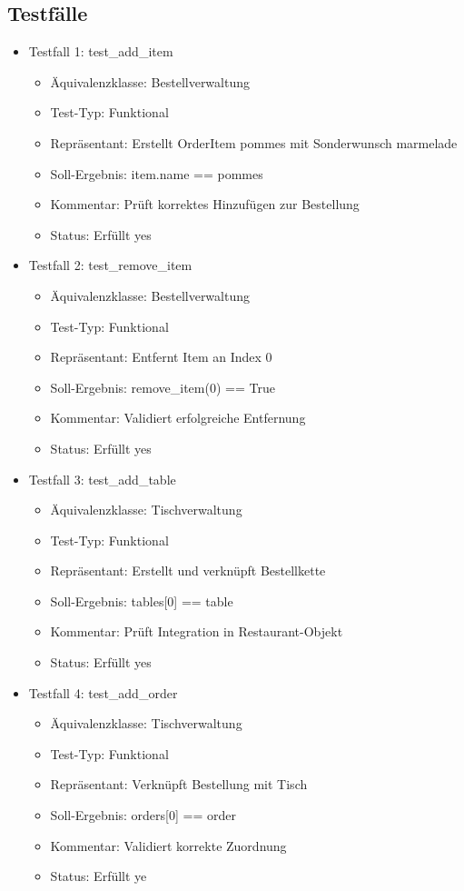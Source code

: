 \documentclass[a4paper,11pt]{article}
\begin{document}
\subsection{Testfälle}
\begin{itemize}
    \item Testfall 1: test\_add\_item
    \begin{itemize}
        \item Äquivalenzklasse: Bestellverwaltung
        \item Test-Typ: Funktional
        \item Repräsentant: Erstellt OrderItem pommes mit Sonderwunsch marmelade
        \item Soll-Ergebnis: item.name == pommes
        \item Kommentar: Prüft korrektes Hinzufügen zur Bestellung
        \item Status: Erfüllt yes
    \end{itemize}
    \item Testfall 2: test\_remove\_item
    \begin{itemize}
        \item Äquivalenzklasse: Bestellverwaltung
        \item Test-Typ: Funktional
        \item Repräsentant: Entfernt Item an Index 0
        \item Soll-Ergebnis: remove\_item(0) == True
        \item Kommentar: Validiert erfolgreiche Entfernung
        \item Status: Erfüllt yes
    \end{itemize}
    \item Testfall 3: test\_add\_table
    \begin{itemize}
        \item Äquivalenzklasse: Tischverwaltung
        \item Test-Typ: Funktional
        \item Repräsentant: Erstellt und verknüpft Bestellkette
        \item Soll-Ergebnis: tables[0] == table
        \item Kommentar: Prüft Integration in Restaurant-Objekt
        \item Status: Erfüllt yes
    \end{itemize}
  \item Testfall 4: test\_add\_order
    \begin{itemize}
        \item Äquivalenzklasse: Tischverwaltung
        \item Test-Typ: Funktional
        \item Repräsentant: Verknüpft Bestellung mit Tisch
        \item Soll-Ergebnis: orders[0] == order
        \item Kommentar: Validiert korrekte Zuordnung
        \item Status: Erfüllt ye
    \end{itemize}
\end{itemize}
\end{document}
